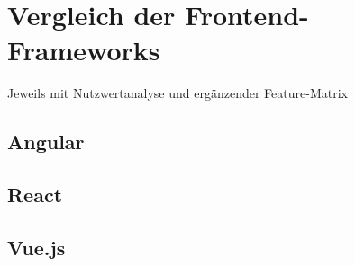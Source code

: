 \newpage
\section{Vergleich der Frontend-Frameworks}
Jeweils mit Nutzwertanalyse und ergänzender Feature-Matrix
\subsection{Angular}
\subsection{React}
\subsection{Vue.js}